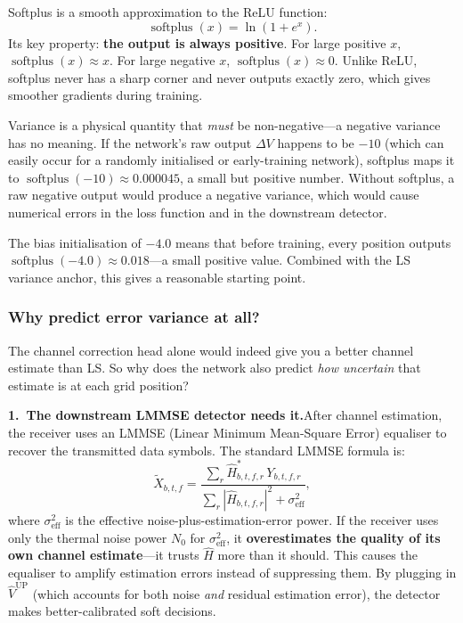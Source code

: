 \documentclass[11pt,a4paper]{article}
\DeclareMathOperator{\softplus}{softplus}
\begin{document}
	Softplus is a smooth approximation to the ReLU function:
	\begin{equation}
		\softplus(x) = \ln(1 + e^x).
		\label{eq:softplus}
	\end{equation}
	Its key property: \textbf{the output is always positive}.  For large positive $x$, $\softplus(x) \approx x$.  For large negative $x$, $\softplus(x) \approx 0$.  Unlike ReLU, softplus never has a sharp corner and never outputs exactly zero, which gives smoother gradients during training.
	
	Variance is a physical quantity that \emph{must} be non-negative---a negative variance has no meaning.  If the network's raw output $\Delta V$ happens to be $-10$ (which can easily occur for a randomly initialised or early-training network), softplus maps it to $\softplus(-10) \approx 0.000045$, a small but positive number.  Without softplus, a raw negative output would produce a negative variance, which would cause numerical errors in the loss function and in the downstream detector.
	
	The bias initialisation of $-4.0$ means that before training, every position outputs $\softplus(-4.0) \approx 0.018$---a small positive value.  Combined with the LS variance anchor, this gives a reasonable starting point.
	
	\subsubsection*{Why predict error variance at all?}
	
	The channel correction head alone would indeed give you a better channel estimate than LS.  So why does the network also predict \emph{how uncertain} that estimate is at each grid position?
	
	\textbf{1.\ The downstream LMMSE detector needs it.}\quad After channel estimation, the receiver uses an LMMSE (Linear Minimum Mean-Square Error) equaliser to recover the transmitted data symbols.  The standard LMMSE formula is:
	\begin{equation}
		\widetilde{X}_{b,t,f} = \frac{\sum_{r} \widehat{H}^*_{b,t,f,r}\, Y_{b,t,f,r}}{\sum_{r} |\widehat{H}_{b,t,f,r}|^2 + \sigma^2_{\mathrm{eff}}},
	\end{equation}
	where $\sigma^2_{\mathrm{eff}}$ is the effective noise-plus-estimation-error power.  If the receiver uses only the thermal noise power $N_0$ for $\sigma^2_{\mathrm{eff}}$, it \textbf{overestimates the quality of its own channel estimate}---it trusts $\widehat{H}$ more than it should.  This causes the equaliser to amplify estimation errors instead of suppressing them.  By plugging in $\widehat{V}^{\mathrm{UP}}$ (which accounts for both noise \emph{and} residual estimation error), the detector makes better-calibrated soft decisions.
	
\end{document}
